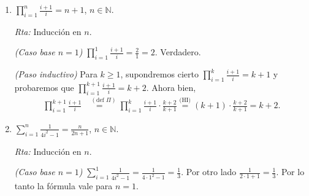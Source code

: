 \documentclass[a4paper,12pt,twoside,spanish,reqno]{amsbook}
\numberwithin{equation}{section}
\newcommand{\rta}{\noindent\textit{Rta: }}
\begin{document}
\begin{enumerate}
\begin{enumerate}
            \rta Esta es llamada la \textit{suma geométrica} y la demostraremos por inducción en $n$.
            
            \textit{(Caso base $n=0$) } $\sum_{k=0}^0 a^k = a^0 = 1$ y $\frac{a^{1}-1}{a-1}=1$. Luego el resultado es verdadero para  $n=1$. 
            
            \textit{(Paso inductivo) }  Para  $h \ge 0$,  supondremos cierto $\sum_{k=0}^h a^k = \frac{a^{h+1}-1}{a-1}$ (HI) y probaremos $\sum_{k=0}^{h+1} a^k = \frac{a^{h+2}-1}{a-1}$. Ahora bien, 
            \begin{align*}
                \sum_{k=0}^{h+1} a^k &\overset{(\text{def } \Sigma)}{=\quad} \;\sum_{k=0}^h a^k + a^{h+1} \overset{\text{(HI)}}{=} \frac{a^{h+1}-1}{a-1} +  a^{h+1} \\
                &= \frac{a^{h+1}-1 + a^{h+1}(a-1)}{a-1} = \frac{a^{h+1}-1 + a^{h+2}-a^{h+1}}{a-1} \\
                &=\frac{a^{h+2}-1}{a-1}.
            \end{align*}
            
            \item  $\displaystyle{ \prod_{i=1}^n \frac{i+1}{i} = n+1}$, $n\in \mathbb N$.
            
            \rta Inducción en $n$.
            
            \textit{(Caso base $n=1$) } $\prod_{i=1}^1 \frac{i+1}{i} = \frac{2}{1} = 2$. Verdadero.   
            
            \textit{(Paso inductivo) }  Para  $k \ge 1$,  supondremos cierto $\prod_{i=1}^k \frac{i+1}{i} = k+1$ y probaremos que $\prod_{i=1}^{k+1} \frac{i+1}{i} = k+2$. Ahora bien,
            \begin{align*}
                \prod_{i=1}^{k+1} \frac{i+1}{i} &\overset{(\text{def } \Pi)}{=\quad} \prod_{i=1}^k \frac{i+1}{i} \cdot \frac{k+2}{k+1} \overset{\text{(HI)}}{=} (k+1) \cdot \frac{k+2}{k+1} = k+2.
            \end{align*}
            
            
            \item $\displaystyle{ \sum_{i=1}^n \frac{1}{4i^2-1} = \frac{n}{2n+1}}$, $n\in \mathbb N$.
            
            \rta Inducción en $n$.
            
            \textit{(Caso base $n=1$) } $\sum_{i=1}^1 \frac{1}{4i^2-1} = \frac{1}{4\cdot 1^2-1} = \frac13$. Por otro lado $\frac{1}{2\cdot 1+1} = \frac13$. Por lo tanto la fórmula vale para $n=1$.  
            

\end{enumerate}
\end{enumerate}
\end{document}

